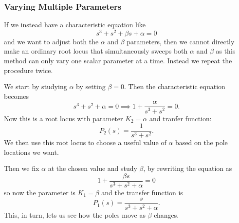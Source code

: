 \subsubsection{Varying Multiple Parameters}
If we instead have a characteristic equation like
\begin{equation*}
  s^3 + s^2 + \beta s + \alpha = 0
\end{equation*}
and we want to adjust both the $\alpha$ and $\beta$ parameters, then we cannot directly make an ordinary root locus that simultaneously sweeps both $\alpha$ and $\beta$ as this method can only vary one scalar parameter at a time.
Instead we repeat the procedure twice.

We start by studying $\alpha$ by setting $\beta = 0$.
Then the characteristic equation becomes
\begin{equation*}
  s^3 + s^2 + \alpha = 0 \implies 1 + \frac{\alpha}{s^3 + s^2} = 0
.\end{equation*}
Now this is a root locus with parameter $K_2 = \alpha$ and tranfer function:
\begin{equation*}
  P_2 (s) = \frac{1}{s^3 + s^2}
.\end{equation*}
We then use this root locus to choose a useful value of $\alpha$ based on the pole locations we want.

Then we fix $\alpha$ at the chosen value and study $\beta$, by rewriting the equation as
\begin{equation*}
  1 + \frac{\beta s}{s^3 + s^2 + \alpha} = 0
\end{equation*}
so now the parameter is $K_1 = \beta$ and the transfer function is
\begin{equation*}
  P_1(s) = \frac{s}{s^3 + s^2 + \alpha}
.\end{equation*}
This, in turn, lets us see how the poles move as $\beta$ changes.
